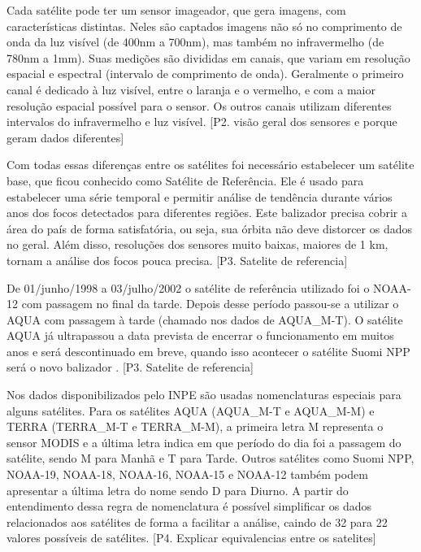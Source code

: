 \documentclass[cic,tc]{iiufrgs}
\begin{document}
Cada satélite pode ter um sensor imageador, que gera imagens, com características
distintas. Neles são captados imagens não só no comprimento de onda da luz
visível (de 400nm a 700nm), mas também no infravermelho (de 780nm a 1mm). 
Suas medições são divididas em canais, que
variam em resolução espacial e espectral (intervalo de comprimento de onda). 
Geralmente o primeiro canal é dedicado à luz visível, entre o laranja e o 
vermelho, e com a maior resolução espacial possível para o sensor. Os outros 
canais utilizam diferentes intervalos do infravermelho e luz visível.
[P2. visão geral dos sensores e porque geram dados diferentes] \par

Com todas essas diferenças entre os satélites foi necessário estabelecer um 
satélite base, que ficou conhecido como Satélite de Referência. Ele é usado 
para estabelecer uma série temporal e permitir análise de tendência durante 
vários anos dos focos detectados para diferentes regiões. 
Este balizador precisa cobrir a área do país de forma
satisfatória, ou seja, sua órbita não deve distorcer os dados no geral. 
Além disso, resoluções dos sensores muito baixas, maiores de 1 km, tornam a 
análise dos focos pouca precisa. [P3. Satelite de referencia] \par

De 01/junho/1998 a 03/julho/2002 o satélite de referência utilizado foi o NOAA-12
com passagem no final da tarde. Depois desse período passou-se a utilizar o 
AQUA com passagem à tarde (chamado nos dados de AQUA\_M-T). O satélite AQUA 
já ultrapassou a data prevista de encerrar o funcionamento em muitos anos e 
será descontinuado em breve, quando isso acontecer o satélite Suomi NPP será o novo
balizador \citep{PerguntasFrequentesINPE}. [P3. Satelite de referencia] \par

Nos dados disponibilizados pelo INPE são usadas nomenclaturas especiais para 
alguns satélites. Para os satélites AQUA (AQUA\_M-T e AQUA\_M-M) e TERRA 
(TERRA\_M-T e TERRA\_M-M), a primeira letra M representa o sensor MODIS e a última
letra indica em que período do dia foi a passagem do satélite, sendo M para Manhã 
e T para Tarde. Outros satélites como Suomi NPP, NOAA-19, NOAA-18, NOAA-16, NOAA-15 
e NOAA-12 também podem apresentar a última letra do nome sendo D para Diurno. 
A partir do entendimento dessa regra de nomenclatura é possível
simplificar os dados relacionados aos satélites de forma a facilitar a análise,
caindo de 32 para 22 valores possíveis de satélites.
[P4. Explicar equivalencias entre os satelites] \par
\end{document}
